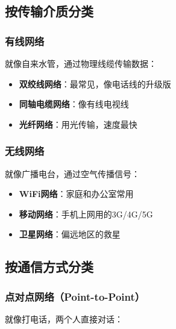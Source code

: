 \documentclass[lang=cn,newtx,10pt,scheme=chinese]{../../elegantbook}
\begin{document}
\subsection{按传输介质分类}

\subsubsection{有线网络}

就像自来水管，通过物理线缆传输数据：

\begin{itemize}
    \item \textbf{双绞线网络}：最常见，像电话线的升级版
    \item \textbf{同轴电缆网络}：像有线电视线
    \item \textbf{光纤网络}：用光传输，速度最快
\end{itemize}

\subsubsection{无线网络}

就像广播电台，通过空气传播信号：

\begin{itemize}
    \item \textbf{WiFi网络}：家庭和办公室常用
    \item \textbf{移动网络}：手机上网用的3G/4G/5G
    \item \textbf{卫星网络}：偏远地区的救星
\end{itemize}

\subsection{按通信方式分类}

\subsubsection{点对点网络（Point-to-Point）}

就像打电话，两个人直接对话：

\begin{center}
\end{center}
\end{document}
